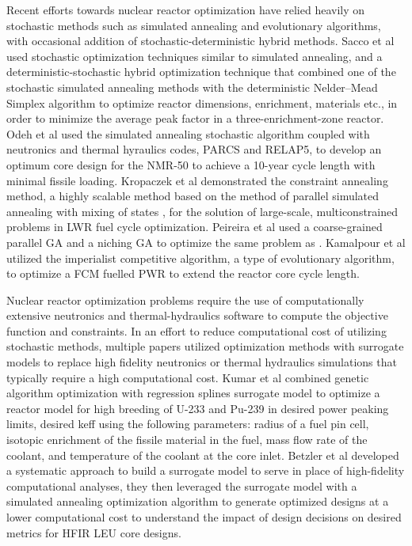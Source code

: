Recent efforts towards nuclear reactor optimization have relied heavily on 
stochastic methods such as simulated annealing and evolutionary algorithms, 
with occasional addition of stochastic-deterministic hybrid methods. 
Sacco et al \cite{sacco_two_2006,sacco_metropolis_2008} used stochastic 
optimization techniques similar to simulated annealing, and a 
deterministic-stochastic hybrid optimization technique
that combined one of the stochastic simulated annealing methods with the 
deterministic Nelder–Mead Simplex algorithm to optimize reactor dimensions, 
enrichment, materials etc., in order to minimize the average peak factor in a 
three-enrichment-zone reactor. 
Odeh et al \cite{odeh_core_2016} used the simulated annealing stochastic algorithm 
coupled with neutronics and thermal hyraulics codes, \gls{PARCS} and RELAP5, 
to develop an optimum core design for the \gls{NMR-50} to achieve a 10-year cycle length 
with minimal fissile loading. 
Kropaczek et al \cite{kropaczek_large-scale_2019} demonstrated the constraint 
annealing method, a highly scalable method based on the method of parallel 
simulated annealing with mixing of states \cite{kropaczek_constraint_2019}, for 
the solution of large-scale, multiconstrained problems in \gls{LWR} fuel cycle 
optimization. 
Peireira et al \cite{pereira_coarse-grained_2003,pereira_parallel_2008} 
used a coarse-grained parallel \gls{GA} and a niching \gls{GA}
to optimize the same problem as \cite{sacco_two_2006}. 
Kamalpour et al \cite{kamalpour_smart_2020} utilized the imperialist competitive 
algorithm, a type of evolutionary algorithm, to optimize a \gls{FCM} fuelled 
\gls{PWR} to extend the reactor core cycle length. 

Nuclear reactor optimization problems require the use of computationally 
extensive neutronics and thermal-hydraulics software to compute the objective 
function and constraints. 
In an effort to reduce computational cost of utilizing stochastic methods, 
multiple papers utilized optimization methods with surrogate models to replace 
high fidelity neutronics or thermal hydraulics simulations that typically 
require a high computational cost. 
Kumar et al \cite{kumar_new_2015} combined genetic algorithm optimization 
with regression splines surrogate model to optimize a reactor model for 
high breeding of U-233 and Pu-239 in desired power peaking limits, desired 
keff using the following parameters: radius of a fuel pin cell, isotopic enrichment 
of the fissile material in the fuel, mass flow rate of the coolant, and temperature 
of the coolant at the core inlet.
Betzler et al \cite{betzler_design_2019} developed a systematic approach to 
build a surrogate model to serve in place of high-fidelity computational 
analyses, they then leveraged the surrogate model with a simulated annealing 
optimization algorithm to generate optimized designs at a lower computational 
cost to understand the impact of design decisions on desired metrics for 
\gls{HFIR} \gls{LEU} core designs. 

